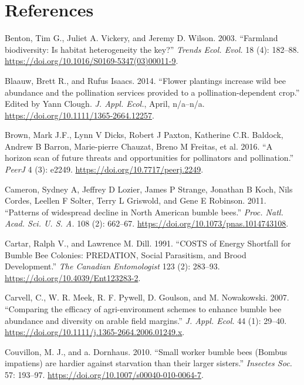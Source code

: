 \documentclass[11pt,]{article}
\begin{document}
\newpage

\hypertarget{references}{%
\section*{References}\label{references}}

\hypertarget{refs}{}
\leavevmode\hypertarget{ref-Benton2003}{}%
Benton, Tim G., Juliet A. Vickery, and Jeremy D. Wilson. 2003.
``Farmland biodiversity: Is habitat heterogeneity the key?''
\emph{Trends Ecol. Evol.} 18 (4): 182--88.
\url{https://doi.org/10.1016/S0169-5347(03)00011-9}.

\leavevmode\hypertarget{ref-Blaauw2014}{}%
Blaauw, Brett R., and Rufus Isaacs. 2014. ``Flower plantings increase
wild bee abundance and the pollination services provided to a
pollination-dependent crop.'' Edited by Yann Clough. \emph{J. Appl.
Ecol.}, April, n/a--n/a. \url{https://doi.org/10.1111/1365-2664.12257}.

\leavevmode\hypertarget{ref-Brown2016a}{}%
Brown, Mark J.F., Lynn V Dicks, Robert J Paxton, Katherine C.R. Baldock,
Andrew B Barron, Marie-pierre Chauzat, Breno M Freitas, et al. 2016. ``A
horizon scan of future threats and opportunities for pollinators and
pollination.'' \emph{PeerJ} 4 (3): e2249.
\url{https://doi.org/10.7717/peerj.2249}.

\leavevmode\hypertarget{ref-Cameron2011}{}%
Cameron, Sydney A, Jeffrey D Lozier, James P Strange, Jonathan B Koch,
Nils Cordes, Leellen F Solter, Terry L Griswold, and Gene E Robinson.
2011. ``Patterns of widespread decline in North American bumble bees.''
\emph{Proc. Natl. Acad. Sci. U. S. A.} 108 (2): 662--67.
\url{https://doi.org/10.1073/pnas.1014743108}.

\leavevmode\hypertarget{ref-Cartar1991}{}%
Cartar, Ralph V., and Lawrence M. Dill. 1991. ``COSTS of Energy
Shortfall for Bumble Bee Colonies: PREDATION, Social Parasitism, and
Brood Development.'' \emph{The Canadian Entomologist} 123 (2): 283--93.
\url{https://doi.org/10.4039/Ent123283-2}.

\leavevmode\hypertarget{ref-Carvell2007}{}%
Carvell, C., W. R. Meek, R. F. Pywell, D. Goulson, and M. Nowakowski.
2007. ``Comparing the efficacy of agri-environment schemes to enhance
bumble bee abundance and diversity on arable field margins.'' \emph{J.
Appl. Ecol.} 44 (1): 29--40.
\url{https://doi.org/10.1111/j.1365-2664.2006.01249.x}.

\leavevmode\hypertarget{ref-Couvillon2010}{}%
Couvillon, M. J., and a. Dornhaus. 2010. ``Small worker bumble bees
(Bombus impatiens) are hardier against starvation than their larger
sisters.'' \emph{Insectes Soc.} 57: 193--97.
\url{https://doi.org/10.1007/s00040-010-0064-7}.
\end{document}
